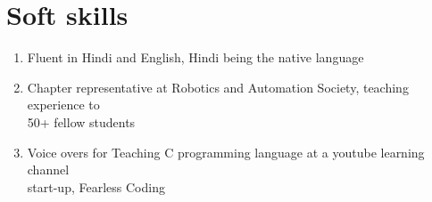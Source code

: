 \documentclass[11pt]{article}
\begin{document}
\begin{minipage}{0.80\linewidth}
\section{\color{orange}Sof\color{black}t skills}
\begin{enumerate}
\item Fluent in Hindi and English, Hindi being the native language
\item Chapter representative at Robotics and Automation Society, teaching experience to \\50+ fellow students
\item Voice overs for Teaching C programming language at a youtube learning channel \\start-up, Fearless Coding
\end{enumerate}
\end{minipage}
\begin{minipage}{0.20\linewidth}
~\\
\end{minipage}
\end{document}
